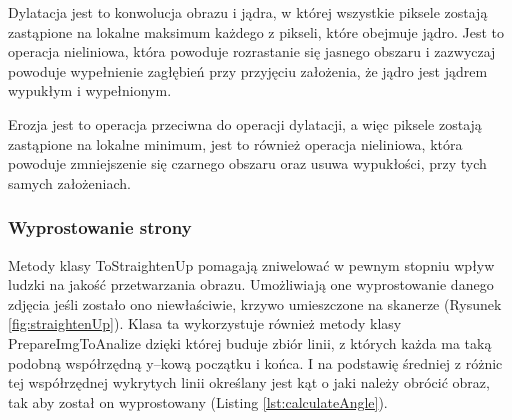 \documentclass[a4paper,12pt]{article}
\newcommand\spacingIndent{2.2em}
\begin{document}
		        Dylatacja jest to konwolucja obrazu i jądra, w której wszystkie piksele zostają zastąpione na lokalne maksimum każdego z pikseli, które obejmuje jądro. Jest to operacja nieliniowa, która powoduje rozrastanie się jasnego obszaru i zazwyczaj powoduje wypełnienie zagłębień przy przyjęciu założenia, że jądro jest jądrem wypukłym i wypełnionym. 
		        
    		    Erozja jest to operacja przeciwna do operacji dylatacji, a więc piksele zostają zastąpione na lokalne minimum, jest to również operacja nieliniowa, która powoduje zmniejszenie się czarnego obszaru oraz usuwa wypukłości, przy tych samych założeniach.
		    
		\subsubsection{Wyprostowanie strony}		
		    \hspace{\spacingIndent} 
		    Metody klasy ToStraightenUp pomagają zniwelować w pewnym stopniu wpływ      ludzki na jakość przetwarzania obrazu. Umożliwiają one wyprostowanie        danego zdjęcia jeśli zostało ono niewłaściwie, krzywo umieszczone na      skanerze (Rysunek \ref{fig:straightenUp}). Klasa ta wykorzystuje również metody klasy PrepareImgToAnalize     dzięki której buduje zbiór linii, z których każda ma taką podobną           współrzędną y--kową początku i końca. I na podstawię średniej z różnic     tej współrzędnej wykrytych linii określany jest kąt o jaki należy        obrócić obraz, tak aby został on wyprostowany (Listing \ref{lst:calculateAngle}).  
		
\end{document}
